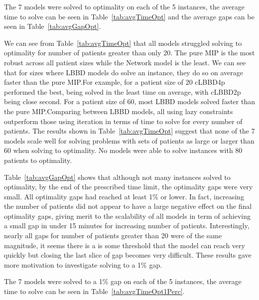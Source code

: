 The 7 models were solved to optimality on each of the 5 instances, the average time to solve can be seen in Table~\ref{tab:avgTimeOpt} and the average gaps can be seen in Table~\ref{tab:avgGapOpt}.



We can see from Table~\ref{tab:avgTimeOpt} that all models struggled solving to optimality for number of patients greater than only 20. The pure MIP is the most robust across all patient sizes while the Network model is the least. We can see that for sizes where LBBD models do solve an instance, they do so on average faster than the pure MIP.\@ For example, for a patient size of 20 cLBBD4p performed the best, being solved in the least time on average, with cLBBD2p being close second. For a patient size of 60, most LBBD models solved faster than the pure MIP.\@ Comparing between LBBD models, all using lazy constraints outperform those using iteration in terms of time to solve for every number of patients. The results shown in Table~\ref{tab:avgTimeOpt} suggest that none of the 7 models scale well for solving problems with sets of patients as large or larger than 60 when solving to optimality. No models were able to solve instances with 80 patients to optimality. 



Table~\ref{tab:avgGapOpt} shows that although not many instances solved to optimality, by the end of the prescribed time limit, the optimality gaps were very small. All optimality gaps had reached at least 1\% or lower. In fact, increasing the number of patients did not appear to have a large negative effect on the final optimality gaps, giving merit to the scalability of all models in term of achieving a small gap in under 15 minutes for increasing number of patients. Interestingly, nearly all gaps for number of patients greater than 20 were of the same magnitude, it seems there is a is some threshold that the model can reach very quickly but closing the last slice of gap becomes very difficult. These results gave more motivation to investigate solving to a 1\% gap.

The 7 models were solved to a 1\% gap on each of the 5 instances, the average time to solve can be seen in Table~\ref{tab:avgTimeOpt1Perc}.


%  


